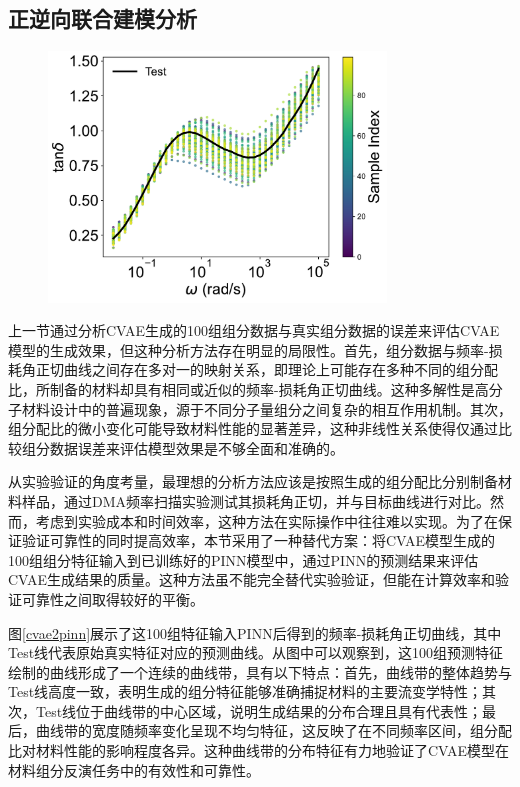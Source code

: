 \subsection{正逆向联合建模分析}
\begin{figure}[htbp]
  \centering
  \includegraphics[width=0.8\textwidth]{Fig/prediction_results.pdf}
\end{figure}
上一节通过分析CVAE生成的100组组分数据与真实组分数据的误差来评估CVAE模型的生成效果，但这种分析方法存在明显的局限性。首先，组分数据与频率-损耗角正切曲线之间存在多对一的映射关系，即理论上可能存在多种不同的组分配比，所制备的材料却具有相同或近似的频率-损耗角正切曲线。这种多解性是高分子材料设计中的普遍现象，源于不同分子量组分之间复杂的相互作用机制。其次，组分配比的微小变化可能导致材料性能的显著差异，这种非线性关系使得仅通过比较组分数据误差来评估模型效果是不够全面和准确的。

从实验验证的角度考量，最理想的分析方法应该是按照生成的组分配比分别制备材料样品，通过DMA频率扫描实验测试其损耗角正切，并与目标曲线进行对比。然而，考虑到实验成本和时间效率，这种方法在实际操作中往往难以实现。为了在保证验证可靠性的同时提高效率，本节采用了一种替代方案：将CVAE模型生成的100组组分特征输入到已训练好的PINN模型中，通过PINN的预测结果来评估CVAE生成结果的质量。这种方法虽不能完全替代实验验证，但能在计算效率和验证可靠性之间取得较好的平衡。

图\ref{cvae2pinn}展示了这100组特征输入PINN后得到的频率-损耗角正切曲线，其中Test线代表原始真实特征对应的预测曲线。从图中可以观察到，这100组预测特征绘制的曲线形成了一个连续的曲线带，具有以下特点：首先，曲线带的整体趋势与Test线高度一致，表明生成的组分特征能够准确捕捉材料的主要流变学特性；其次，Test线位于曲线带的中心区域，说明生成结果的分布合理且具有代表性；最后，曲线带的宽度随频率变化呈现不均匀特征，这反映了在不同频率区间，组分配比对材料性能的影响程度各异。这种曲线带的分布特征有力地验证了CVAE模型在材料组分反演任务中的有效性和可靠性。

